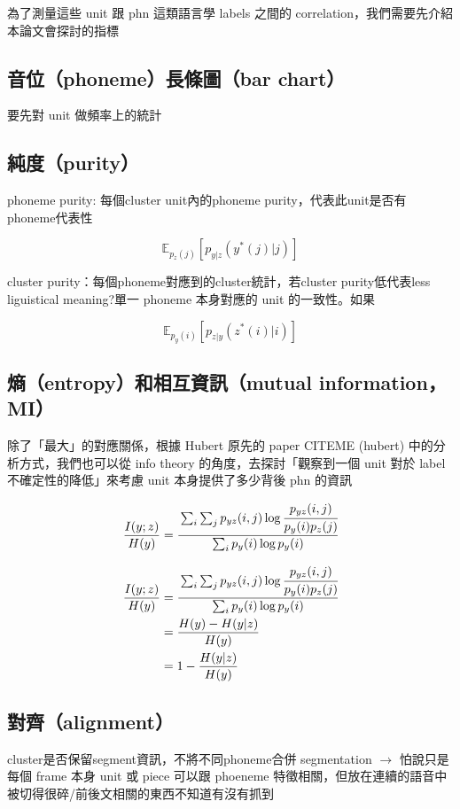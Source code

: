 為了測量這些 unit 跟 phn 這類語言學 labels 之間的 correlation，我們需要先介紹本論文會探討的指標

\subsection{音位（phoneme）長條圖（bar chart）}

要先對 unit 做頻率上的統計

\subsection{純度（purity）}


phoneme purity: 每個cluster unit內的phoneme purity，代表此unit是否有phoneme代表性

\newcommand{\E}{\mathbb{E}}

$$\E_{p_z(j)}\left[p_{y|z}(y^*(j)|j) \right]$$

cluster purity：每個phoneme對應到的cluster統計，若cluster purity低代表less liguistical meaning?單一 phoneme 本身對應的 unit 的一致性。如果

$$\E_{p_y(i)}\left[p_{z|y}(z^*(i)|i) \right]$$

\subsection{熵（entropy）和相互資訊（mutual information，MI）}

除了「最大」的對應關係，根據 Hubert 原先的 paper CITEME (hubert) 中的分析方式，我們也可以從 info theory 的角度，去探討「觀察到一個 unit 對於 label 不確定性的降低」來考慮 unit 本身提供了多少背後 phn 的資訊

$$\frac{I(y;z)}{H(y)}=\cfrac{\sum_i \sum_j p_{yz}(i, j) \log \cfrac{p_{yz}(i, j)}{p_y(i)p_z(j)}}{\sum_i p_y(i) \log p_y(i)}$$

\begin{align}
\frac{I(y;z)}{H(y)}&=\cfrac{\sum_i \sum_j p_{yz}(i, j) \log \cfrac{p_{yz}(i, j)}{p_y(i)p_z(j)}}{\sum_i p_y(i) \log p_y(i)} \\
&=\frac{H(y)-H(y|z)}{H(y)} \\
&=1-\frac{H(y|z)}{H(y)}
\end{align}



\subsection{對齊（alignment）}
cluster是否保留segment資訊，不將不同phoneme合併
segmentation $\rightarrow$
怕說只是每個 frame 本身 unit 或 piece 可以跟 phoeneme 特徵相關，但放在連續的語音中被切得很碎/前後文相關的東西不知道有沒有抓到

